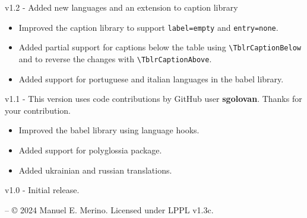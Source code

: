 \documentclass[a4paper,11pt]{article}
\begin{document}
	 v1.2 - Added new languages and an extension to caption library
	 \begin{itemize}
	 	\item Improved the caption library to support \texttt{label=empty} and \texttt{entry=none}.
	 	\item Added partial support for captions below the table using \verb|\TblrCaptionBelow| and to reverse the changes with \verb|\TblrCaptionAbove|.
	 	\item Added support for portuguese and italian languages in the babel library.
	 \end{itemize}

	 v1.1 - This version uses code contributions by GitHub user \textbf{sgolovan}. Thanks for your contribution.
		\begin{itemize}
			\item Improved the babel library using language hooks.
			\item Added support for polyglossia package.
			\item Added ukrainian and russian translations.
		\end{itemize}

	v1.0 - Initial release.

	\vfill
	\centering
	\footnotesize \tblrextras{} -- {\copyright} 2024 Manuel E. Merino. Licensed under LPPL v1.3c.
\end{document}
